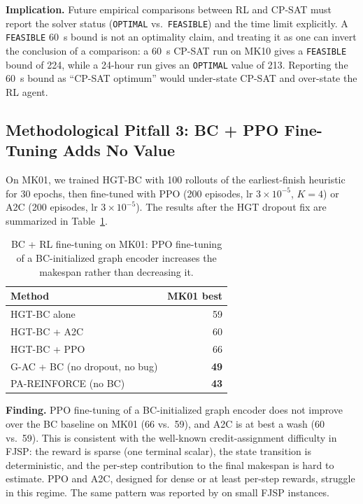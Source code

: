 \documentclass[10pt]{article}
\theoremstyle{definition}
\begin{document}
\textbf{Implication.} Future empirical comparisons
between RL and CP-SAT must report the solver status
(\texttt{OPTIMAL} vs.\ \texttt{FEASIBLE}) and the time
limit explicitly. A \texttt{FEASIBLE} 60~s bound is not
an optimality claim, and treating it as one can invert
the conclusion of a comparison: a 60~s CP-SAT run on
MK10 gives a \texttt{FEASIBLE} bound of 224, while a
24-hour run gives an \texttt{OPTIMAL} value of 213.
Reporting the 60~s bound as ``CP-SAT optimum'' would
under-state CP-SAT and over-state the RL agent.

\subsection{Methodological Pitfall 3: BC + PPO Fine-Tuning Adds No Value}
\label{sec:lessons-bc}

On MK01, we trained HGT-BC with 100 rollouts of the
earliest-finish heuristic for 30 epochs, then fine-tuned with PPO
(200 episodes, lr $3 \times 10^{-5}$, $K=4$) or A2C (200
episodes, lr $3 \times 10^{-5}$). The results after the HGT
dropout fix are summarized in Table~\ref{tab:bc-finetune}.

\begin{table}[h]
\centering
\caption{BC + RL fine-tuning on MK01: PPO fine-tuning of a
BC-initialized graph encoder increases the makespan
rather than decreasing it.}
\label{tab:bc-finetune}
\small
\begin{tabular}{lr}
\toprule
Method & MK01 best \\
\midrule
HGT-BC alone        & 59 \\
HGT-BC + A2C        & 60 \\
HGT-BC + PPO        & 66 \\
G-AC + BC (no dropout, no bug) & \textbf{49} \\
PA-REINFORCE (no BC) & \textbf{43} \\
\bottomrule
\end{tabular}
\end{table}

\textbf{Finding.} PPO fine-tuning of a BC-initialized
graph encoder does not improve over the BC baseline on
MK01 (66 vs.\ 59), and A2C is at best a wash (60 vs.\
59). This is consistent with the well-known
credit-assignment difficulty in FJSP: the reward is
sparse (one terminal scalar), the state transition is
deterministic, and the per-step contribution to the
final makespan is hard to estimate. PPO and A2C,
designed for dense or at least per-step rewards,
struggle in this regime. The same pattern was reported
by \citet{Lei2022} on small FJSP instances.
\end{document}
